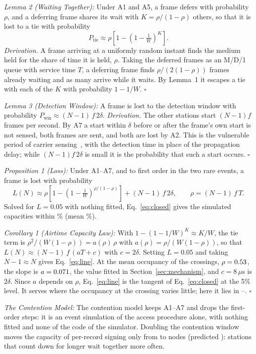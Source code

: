 \documentclass[lineno,pdflatex,sn-mathphys-num]{sn-jnl}
\newcommand{\us}{\,\ensuremath{\mu}s}
\newcommand{\runin}[1]{\textit{#1:}}
\renewcommand{\_}{\authbcunderscore\allowbreak}
\begin{document}
\begin{appendices}
\runin{Lemma 2 (Waiting Together)} Under A1 and A5, a frame defers with probability $\rho$, and
a deferring frame shares its wait with $K = \rho/(1-\rho)$ others, so that it is lost to a tie
with probability
\begin{equation}
P_{\mathrm{tie}} \approx \rho\left[1-\left(1-\tfrac{1}{W}\right)^{K}\right].
\label{eq:tie}
\end{equation}
\emph{Derivation.} A frame arriving at a uniformly random instant finds the medium held for the
share of time it is held, $\rho$. Taking the deferred frames as an M/D/1 queue with service time
$T$, a deferring frame finds $\rho/(2(1-\rho))$ frames already waiting and as many arrive while
it waits. By Lemma~1 it escapes a tie with each of the $K$ with probability $1-1/W$. $\square$

\runin{Lemma 3 (Detection Window)} A frame is lost to the detection window with probability
$P_{\mathrm{win}} \approx (N-1)\,f\,2\delta$. \emph{Derivation.} The other stations start
$(N-1)f$ frames per second. By A7 a start within $\delta$ before or after the frame's own start
is not sensed, both frames are sent, and both are lost by A2. This is the vulnerable period of
carrier sensing~\cite{kleinrock1975csma}, with the detection time in place of the propagation
delay; while $(N-1)f\,2\delta$ is small it is the probability that such a start occurs. $\square$

\runin{Proposition 1 (Loss)} Under A1--A7, and to first order in the two rare events, a frame is
lost with probability
\begin{equation}
L(N) \approx \rho\left[1-\left(1-\tfrac{1}{W}\right)^{\rho/(1-\rho)}\right] + (N-1)\,f\,2\delta,
\qquad \rho = (N-1)\,f\,T.
\label{eq:closed}
\end{equation}
Solved for $L = 0.05$ with nothing fitted, Eq.~\eqref{eq:closed} gives the \modelCells{} simulated
capacities within \closedWorst\% (mean \closedMean\%).

\runin{Corollary 1 (Airtime Capacity Law)} With $1-(1-1/W)^{K} \approx K/W$, the tie term is
$\rho^2/(W(1-\rho)) = a(\rho)\,\rho$ with $a(\rho) = \rho/(W(1-\rho))$, so that
$L(N) \approx (N-1)\,f\,(aT + c)$ with $c = 2\delta$. Setting $L = 0.05$ and taking $N-1 \approx
N$ gives Eq.~\eqref{eq:line}. At the mean occupancy of the crossings, $\rho = 0.53$, the
slope is $a = 0.071$, the value fitted in Section~\ref{sec:mechanism}, and $c = 8$\us{} is
$2\delta$. Since $a$ depends on $\rho$, Eq.~\eqref{eq:line} is the tangent of
Eq.~\eqref{eq:closed} at the 5\% level. It serves where the occupancy at the crossing varies
little; here it lies in \modelRhoLo--\modelRhoHi. $\square$

\runin{The Contention Model} The contention model keeps A1--A7 and drops the first-order steps:
it is an event simulation of the access procedure alone, with nothing fitted and none of the
code of the simulator. Doubling the contention window moves the capacity of
per-record signing only from \modelBaseC{} to \modelNsWindowC{} nodes (predicted
\modelPredWindowC): stations that count down for longer wait together more often.

\end{appendices}


\end{document}
